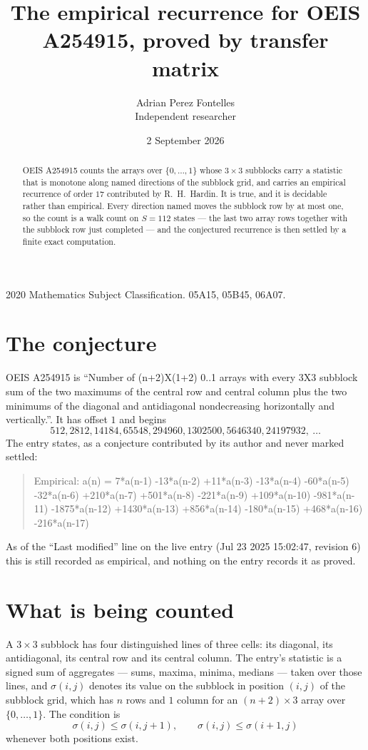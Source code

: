 \documentclass[11pt,a4paper]{article}
\title{The empirical recurrence for OEIS A254915, proved by transfer matrix}
\author{Adrian Perez Fontelles\\ \small Independent researcher}
\date{2 September 2026}
\theoremstyle{plain}
\theoremstyle{definition}
\begin{document}
\maketitle

\begin{abstract}
OEIS A254915 counts the arrays over $\{0,\dots,1\}$ whose $3\times3$ subblocks carry a
statistic that is monotone along named directions of the subblock grid, and carries an
empirical recurrence of order $17$ contributed by R.~H.~Hardin. It is true, and it is
decidable rather than empirical. Every direction named moves the subblock row by at most one,
so the count is a walk count on $S=112$ states --- the last two array rows together with the
subblock row just completed --- and the conjectured recurrence is then settled by a finite
exact computation.
\end{abstract}

\noindent\small 2020 Mathematics Subject Classification. 05A15, 05B45, 06A07.\normalsize

\section{The conjecture}

OEIS A254915 is ``Number of (n+2)X(1+2) 0..1 arrays with every 3X3 subblock sum of the two maximums of the central row and central column plus the two minimums of the diagonal and antidiagonal nondecreasing horizontally and vertically.''. It has offset $1$ and begins
\[
512, 2812, 14184, 65548, 294960, 1302500, 5646340, 24197932,\ \dots
\]
The entry states, as a conjecture contributed by its author and never marked settled:
\begin{quote}
Empirical: a(n) = 7*a(n-1) -13*a(n-2) +11*a(n-3) -13*a(n-4) -60*a(n-5) -32*a(n-6) +210*a(n-7) +501*a(n-8) -221*a(n-9) +109*a(n-10) -981*a(n-11) -1875*a(n-12) +1430*a(n-13) +856*a(n-14) -180*a(n-15) +468*a(n-16) -216*a(n-17)
\end{quote}
As of the ``Last modified'' line on the live entry (Jul 23 2025 15:02:47, revision 6) this is still
recorded as empirical, and nothing on the entry records it as proved.

\section{What is being counted}

A $3\times3$ subblock has four distinguished lines of three cells: its diagonal, its
antidiagonal, its central row and its central column. The entry's statistic is a signed sum of
aggregates --- sums, maxima, minima, medians --- taken over those lines, and $\sigma(i,j)$
denotes its value on the subblock in position $(i,j)$ of the subblock grid, which has $n$ rows
and $1$ column for an $(n+2)\times3$ array over $\{0,\dots,1\}$. The condition is
\[
\sigma(i,j)\le\sigma(i,j+1),\qquad \sigma(i,j)\le\sigma(i+1,j)
\]
whenever both positions exist.
\end{document}
